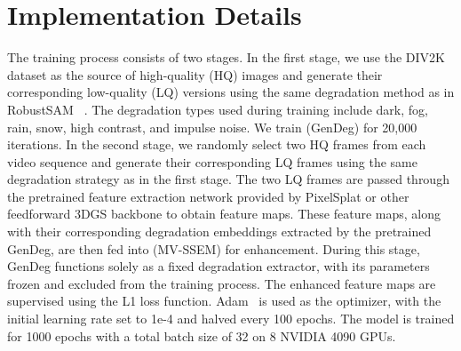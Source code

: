 % 

\maketitle


\section{Implementation Details}

The training process consists of two stages. In the first stage, we use the DIV2K dataset as the source of high-quality (HQ) images and generate their corresponding low-quality (LQ) versions using the same degradation method as in RobustSAM ~\cite{chen2024robustsam}. The degradation types used during training include dark, fog, rain, snow, high contrast, and impulse noise. We train \NAMEdeg (GenDeg) for 20{,}000 iterations. 
In the second stage, we randomly select two HQ frames from each video sequence and generate their corresponding LQ frames using the same degradation strategy as in the first stage. The two LQ frames are passed through the pretrained feature extraction network provided by PixelSplat or other feedforward 3DGS backbone to obtain feature maps. These feature maps, along with their corresponding degradation embeddings extracted by the pretrained GenDeg, are then fed into \NAMEfem (MV-SSEM) for enhancement. During this stage, GenDeg functions solely as a fixed degradation extractor, with its parameters frozen and excluded from the training process. The enhanced feature maps are supervised using the L1 loss function. Adam~\cite{kingma2014adam} is used as the optimizer, with the initial learning rate set to 1e-4 and halved every 100 epochs. The model is trained for 1000 epochs with a total batch size of 32 on 8 NVIDIA 4090 GPUs.


